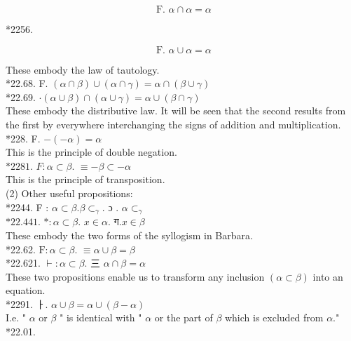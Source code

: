 \documentclass[10pt]{article}
\begin{document}
$$
\text { F. } \alpha \cap \alpha=\alpha
$$

*2256.

$$
\text { F. } \alpha \cup \alpha=\alpha
$$

These embody the law of tautology.\\
*22.68. F. $(\alpha \cap \beta) \cup(\alpha \cap \gamma)=\alpha \cap(\beta \cup \gamma)$\\
*22.69. $\cdot(\alpha \cup \beta) \cap(\alpha \cup \gamma)=\alpha \cup(\beta \cap \gamma)$\\
These embody the distributive law. It will be seen that the second results from the first by everywhere interchanging the signs of addition and multiplication.\\
*228. F. $-(-\alpha)=\alpha$\\
This is the principle of double negation.\\
$* 2281$. $F: \alpha \subset \beta$. $\equiv-\beta \subset-\alpha$\\
This is the principle of transposition.\\
(2) Other useful propositions:\\
*2244. F : $\alpha \subset \beta . \beta \subset_{\gamma}$. ɔ . $\alpha \subset_{\gamma}$\\
$* 22.441$. $*: \alpha \subset \beta$. $x \in \alpha$. ग.$x \in \beta$\\
These embody the two forms of the syllogism in Barbara.\\
*22.62. $\mathrm{F}: \alpha \subset \beta$. $\equiv \alpha \cup \beta=\beta$\\
*22.621. $\vdash: \alpha \subset \beta$. 三 $\alpha \cap \beta=\alpha$\\
These two propositions enable us to transform any inclusion $(\alpha \subset \beta)$ into an equation.\\
*2291. ㅏ. $\alpha \cup \beta=\alpha \cup(\beta-\alpha)$\\
I.e. " $\alpha$ or $\beta$ " is identical with " $\alpha$ or the part of $\beta$ which is excluded from $\alpha$."\\
*22.01.
\end{document}
